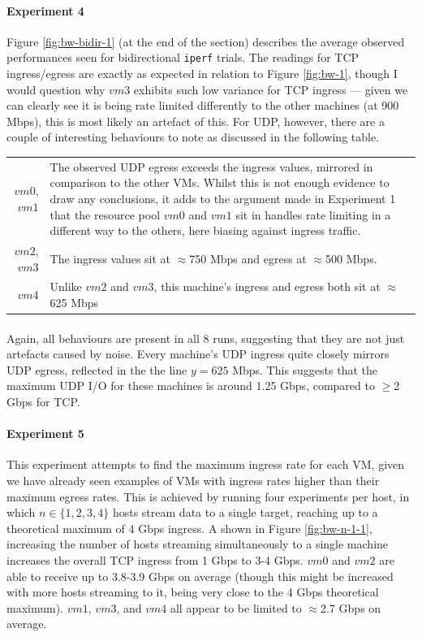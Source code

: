 \documentclass[a4paper,10pt]{article}
\begin{document}
\paragraph{Experiment 4} Figure \ref{fig:bw-bidir-1} (at the end of the section) describes the average observed performances seen for bidirectional \texttt{iperf} trials. The readings for TCP ingress/egress are exactly as expected in relation to Figure \ref{fig:bw-1}, though I would question why $vm3$ exhibits such low variance for TCP ingress --- given we can clearly see it is being rate limited differently to the other machines (at 900 Mbps), this is most likely an artefact of this. For UDP, however, there are a couple of interesting behaviours to note as discussed in the following table.

\begin{table}[h]
    \centering
    \bgroup
    \def\arraystretch{1.5}%
    \begin{tabularx}{\textwidth}{r|X}
       $vm0$, $vm1$ & The observed UDP egress exceeds the ingress values, mirrored in comparison to the other VMs. Whilst this is not enough evidence to draw any conclusions, it adds to the argument made in Experiment 1 that the resource pool $vm0$ and $vm1$ sit in handles rate limiting in a different way to the others, here biasing against ingress traffic. \\
       $vm2$, $vm3$ & The ingress values sit at $\approx$750 Mbps and egress at $\approx$500 Mbps. \\
       $vm4$ & Unlike $vm2$ and $vm3$, this machine's ingress and egress both sit at $\approx$625 Mbps
    \end{tabularx}
    \egroup
\end{table}

\paragraph{} Again, all behaviours are present in all 8 runs, suggesting that they are not just artefacts caused by noise. Every machine's UDP ingress quite closely mirrors UDP egress, reflected in the the line $y = 625$ Mbps. This suggests that the maximum UDP I/O for these machines is around 1.25 Gbps, compared to $\geq$2 Gbps for TCP.

\paragraph{Experiment 5} This experiment attempts to find the maximum ingress rate for each VM, given we have already seen examples of VMs with ingress rates higher than their maximum egress rates. This is achieved by running four experiments per host, in which $n \in \{1,2,3,4\}$ hosts stream data to a single target, reaching up to a theoretical maximum of 4 Gbps ingress. A shown in Figure \ref{fig:bw-n-1-1}, increasing the number of hosts streaming simultaneously to a single machine increases the overall TCP ingress from 1 Gbps to 3-4 Gbps. $vm0$ and $vm2$ are able to receive up to 3.8-3.9 Gbps on average (though this might be increased with more hosts streaming to it, being very close to the 4 Gbps theoretical maximum). $vm1$, $vm3$, and $vm4$ all appear to be limited to $\approx$2.7 Gbps on average. 
\end{document}
